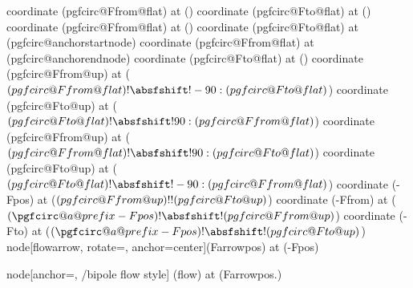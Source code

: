 {    
    \ifx\pgf@circ@temp\pgf@temp%
        coordinate (pgfcirc@Ffrom@flat) at (\tikztostart)
        coordinate (pgfcirc@Fto@flat) at (\tikztotarget)
    \else%
        \ifpgf@circuit@bipole@flow@before
            coordinate (pgfcirc@Ffrom@flat) at (\tikztostart)
            coordinate (pgfcirc@Fto@flat) at (pgfcirc@anchorstartnode)
        \else
            coordinate (pgfcirc@Ffrom@flat) at (pgfcirc@anchorendnode)
            coordinate (pgfcirc@Fto@flat) at (\tikztotarget)
        \fi
    \fi
    \pgfextra{
        \newdimen{\absfshift}
        \def\flow@offset{\ctikzvalof{flow/offset}\pgf@circ@Rlen}
        \absfshift=\flow@offset
        \ifpgf@circuit@bipole@flow@backward
            \pgfmathsubtract{\pgf@circ@rounded@dir}{180}
            \edef\pgf@circ@rounded@dir{\expandafter\pgf@circ@stripdecimals\pgfmathresult\pgf@nil}
        \fi
    }
    \ifpgf@circuit@bipole@flow@below
        coordinate (pgfcirc@Ffrom@up) at ($(pgfcirc@Ffrom@flat) ! \absfshift !-90: (pgfcirc@Fto@flat)$)
        coordinate (pgfcirc@Fto@up) at ($(pgfcirc@Fto@flat) ! \absfshift !90: (pgfcirc@Ffrom@flat)$)
    \else
        coordinate (pgfcirc@Ffrom@up) at ($(pgfcirc@Ffrom@flat) ! \absfshift !90: (pgfcirc@Fto@flat)$)
        coordinate (pgfcirc@Fto@up) at ($(pgfcirc@Fto@flat) ! \absfshift !-90: (pgfcirc@Ffrom@flat)$)
    \fi
    coordinate (\pgfcirc@a@prefix-Fpos) at ($(pgfcirc@Ffrom@up) ! \ctikzvalof{flow/distance} !(pgfcirc@Fto@up)$)
    coordinate (\pgfcirc@a@prefix-Ffrom) at ($(\pgfcirc@a@prefix-Fpos)!\absfshift!(pgfcirc@Ffrom@up)$)
    coordinate (\pgfcirc@a@prefix-Fto) at ($(\pgfcirc@a@prefix-Fpos)!\absfshift!(pgfcirc@Fto@up) $)
    \else
        node[flowarrow, rotate=\pgf@circ@rounded@dir, anchor=center](Farrowpos) at (\pgfcirc@a@prefix-Fpos) {}

        node[anchor=\pgf@circ@dir, \circuitikzbasekey/bipole flow style]
        (flow) at (Farrowpos.\pgf@circ@bipole@flow@label@where) {}
    \fi

    \ifpgf@circuit@bipole@flow@backward
    \fi

}

\endinput
